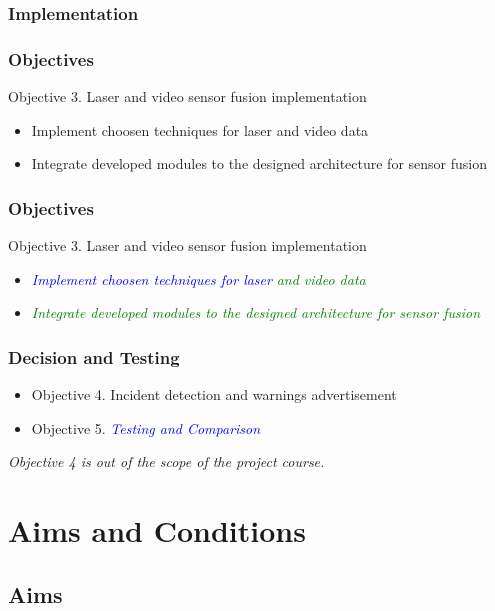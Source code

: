 \documentclass{beamer}
\begin{document}
\subsubsection{Implementation}
\frame
{
	\frametitle{Objectives}
	Objective 3. Laser and video sensor fusion implementation
	\begin{itemize}	
		\item Implement choosen techniques for laser and video data
		\item Integrate developed modules to the designed architecture for sensor fusion
	\end{itemize}
}

\frame
{
	\frametitle{Objectives}
	Objective 3. Laser and video sensor fusion implementation
	\begin{itemize}	
		\item \textcolor{blue}{\emph{Implement choosen techniques for laser}}\textcolor{green}{\emph{ and video data}}
		\item \textcolor{green}{\emph{Integrate developed modules to the designed architecture for sensor fusion}}	
	\end{itemize}
}

\subsubsection{Decision and Testing}
\frame
{
	\begin{itemize}	
		\item Objective 4. Incident detection and warnings advertisement
		\item Objective 5. \textcolor{blue}{\emph{Testing and Comparison}}
	\end{itemize}
	
	\emph{Objective 4 is out of the scope of the project course.}
}

\section{Aims and Conditions}
\subsection{Aims}
\end{document}
